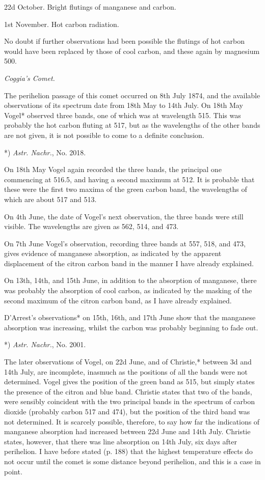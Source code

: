 \documentclass[a4paper, 12pt, oneside, polutonikogreek, english]{article}
\begin{document}
22d October. Bright flutings of manganese and carbon.

1st November. Hot carbon radiation.

No doubt if further observations had been possible the flutings of hot carbon would have been replaced by those of cool carbon, and these again by magnesium 500.

\emph{Coggia's Comet.}

The perihelion passage of this comet occurred on 8th July 1874, and the available observations of its spectrum date from 18th May to 14th July. On 18th May Vogel* observed three bands, one of which was at wavelength 515. This was probably the hot carbon fluting at 517, but as the wavelengths of the other bands are not given, it is not possible to come to a definite conclusion.

*) \emph{Astr. Nachr.}, No. 2018.

On 18th May Vogel again recorded the three bands, the principal one commencing at 516.5, and having a second maximum at 512. It is probable that these were the first two maxima of the green carbon band, the wavelengths of which are about 517 and 513.

On 4th June, the date of Vogel's next observation, the three bands were still visible. The wavelengths are given as 562, 514, and 473.

On 7th June Vogel's observation, recording three bands at 557, 518, and 473, gives evidence of manganese absorption, as indicated by the apparent displacement of the citron carbon band in the manner I have already explained.

On 13th, 14th, and 15th June, in addition to the absorption of manganese, there was probably the absorption of cool carbon, as indicated by the masking of the second maximum of the citron carbon band, as I have already explained.

D'Arrest's observations* on 15th, 16th, and 17th June show that the manganese absorption was increasing, whilst the carbon was probably beginning to fade out.

*) \emph{Astr. Nachr.}, No. 2001.

The later observations of Vogel, on 22d June, and of Christie,* between 3d and 14th July, are incomplete, inasmuch as the positions of all the bands were not determined. Vogel gives the position of the green band as 515, but simply states the presence of the citron and blue band. Christie states that two of the bands, were sensibly coincident with the two principal bands in the spectrum of carbon dioxide (probably carbon 517 and 474), but the position of the third band was not determined. It is scarcely possible, therefore, to say how far the indications of manganese absorption had increased between 22d June and 14th July. Christie states, however, that there was line absorption on 14th July, six days after perihelion. I have before stated (p. 188) that the highest temperature effects do not occur until the comet is some distance beyond perihelion, and this is a case in point.
\end{document}
